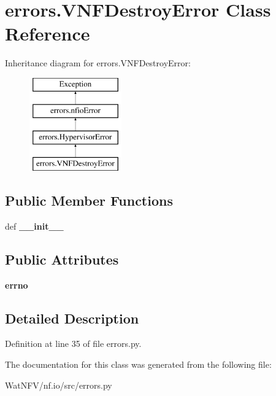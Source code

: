 \hypertarget{classerrors_1_1VNFDestroyError}{\section{errors.\-V\-N\-F\-Destroy\-Error Class Reference}
\label{classerrors_1_1VNFDestroyError}
}
Inheritance diagram for errors.\-V\-N\-F\-Destroy\-Error\-:\begin{figure}[H]
\begin{center}
\leavevmode
\includegraphics[height=4.000000cm]{classerrors_1_1VNFDestroyError}
\end{center}
\end{figure}
\subsection*{Public Member Functions}
\begin{DoxyCompactItemize}
\item 
\hypertarget{classerrors_1_1VNFDestroyError_a182be047d0ee59430d28c283377b25c0}{def {\bfseries \-\_\-\-\_\-init\-\_\-\-\_\-}}\label{classerrors_1_1VNFDestroyError_a182be047d0ee59430d28c283377b25c0}

\end{DoxyCompactItemize}
\subsection*{Public Attributes}
\begin{DoxyCompactItemize}
\item 
\hypertarget{classerrors_1_1VNFDestroyError_a370037b1906ac4230497a9f4f32160db}{{\bfseries errno}}\label{classerrors_1_1VNFDestroyError_a370037b1906ac4230497a9f4f32160db}

\end{DoxyCompactItemize}


\subsection{Detailed Description}


Definition at line 35 of file errors.\-py.



The documentation for this class was generated from the following file\-:\begin{DoxyCompactItemize}
\item 
Wat\-N\-F\-V/nf.\-io/src/errors.\-py\end{DoxyCompactItemize}
